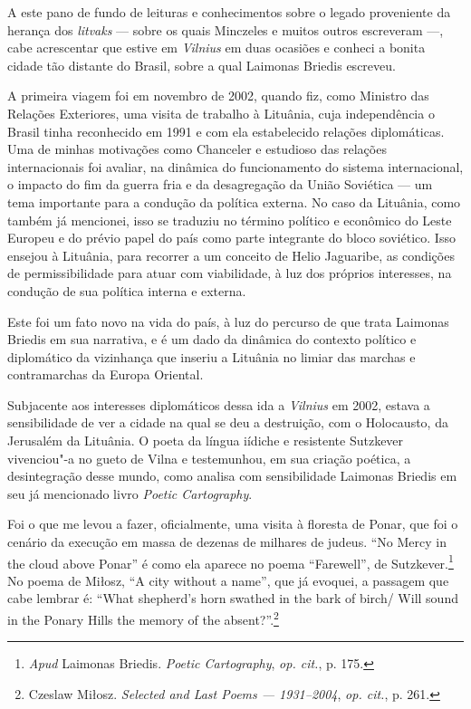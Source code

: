 A este pano de fundo de leituras e conhecimentos sobre o legado
proveniente da herança dos \textit{litvaks} --- sobre os quais Minczeles e
muitos outros escreveram ---, cabe acrescentar que estive em \textit{Vilnius} em
duas ocasiões e conheci a bonita cidade tão distante do Brasil, sobre a
qual Laimonas Briedis escreveu.

A primeira viagem foi em novembro de 2002, quando fiz, como Ministro das
Relações Exteriores, uma visita de trabalho à Lituânia, cuja
independência o Brasil tinha reconhecido em 1991 e com ela estabelecido
relações diplomáticas. Uma de minhas motivações como Chanceler e
estudioso das relações internacionais foi avaliar, na dinâmica do
funcionamento do sistema internacional, o impacto do fim da guerra fria
e da desagregação da União Soviética --- um tema importante para a
condução da política externa. No caso da Lituânia, como também já
mencionei, isso se traduziu no término político e econômico do Leste
Europeu e do prévio papel do país como parte integrante do bloco
soviético. Isso ensejou à Lituânia, para recorrer a um conceito de Helio
Jaguaribe, as condições de permissibilidade para atuar com viabilidade,
à luz dos próprios interesses, na condução de sua política interna e
externa.

Este foi um fato novo na vida do país, à luz do percurso de que trata
Laimonas Briedis em sua narrativa, e é um dado da dinâmica do contexto
político e diplomático da vizinhança que inseriu a Lituânia no limiar
das marchas e contramarchas da Europa Oriental.

Subjacente aos interesses diplomáticos dessa ida a \textit{Vilnius} em 2002,
estava a sensibilidade de ver a cidade na qual se deu a destruição, com
o Holocausto, da Jerusalém da Lituânia. O poeta da língua iídiche e
resistente Sutzkever vivenciou"-a no gueto de Vilna e testemunhou, em sua
criação poética, a desintegração desse mundo, como analisa com
sensibilidade Laimonas Briedis em seu já mencionado livro \textit{Poetic
Cartography}.

Foi o que me levou a fazer, oficialmente, uma visita à floresta de
Ponar, que foi o cenário da execução em massa de dezenas de milhares de
judeus. ``No Mercy in the cloud above Ponar'' é como ela aparece no
poema ``Farewell'', de Sutzkever.\footnote{\textit{Apud} Laimonas Briedis.
  \textit{Poetic Cartography}, \textit{op. cit.}, p. 175.} No poema de
Miłosz, ``A city without a name'', que já evoquei, a passagem que cabe
lembrar é: ``What shepherd's horn swathed in the bark of birch/ Will
sound in the Ponary Hills the memory of the absent?''.\footnote{Czeslaw
  Miłosz. \textit{Selected and Last Poems --- 1931--2004}, \textit{op.
  cit.}, p. 261.}

